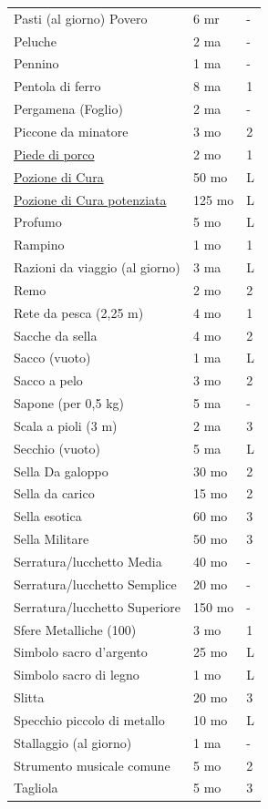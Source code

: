 \begin{multicols}{2}
\begin{tabular}{p{5.1cm}p{1.5cm}p{0.7cm}}
Pasti (al giorno) Povero & 6 mr & - \\
Peluche & 2 ma & - \\
Pennino & 1 ma & - \\
Pentola di ferro & 8 ma & 1 \\
Pergamena (Foglio) & 2 ma & - \\
Piccone da minatore & 3 mo & 2 \\
\hyperlink{piedediporco}{Piede di porco} & 2 mo & 1 \\
\hyperlink{Equip Pozione di Cura}{Pozione di Cura} & 50 mo & L \\
\hyperlink{Equip Pozione di Cura potenziata}{Pozione di Cura potenziata} & 125 mo & L \\
Profumo & 5 mo & L \\
Rampino & 1 mo & 1 \\
Razioni da viaggio (al giorno) & 3 ma & L \\
Remo & 2 mo & 2 \\
Rete da pesca (2,25 m) & 4 mo & 1 \\
Sacche da sella & 4 mo & 2 \\
Sacco (vuoto) & 1 ma & L \\
Sacco a pelo & 3 mo & 2 \\
Sapone (per 0,5 kg) & 5 ma & - \\
Scala a pioli (3 m) & 2 ma & 3 \\
Secchio (vuoto) & 5 ma & L \\
Sella Da galoppo & 30 mo & 2 \\
Sella da carico & 15 mo & 2 \\
Sella esotica & 60 mo & 3 \\
Sella Militare & 50 mo & 3 \\
Serratura/lucchetto Media & 40 mo & - \\
Serratura/lucchetto Semplice & 20 mo & - \\
Serratura/lucchetto Superiore & 150 mo & - \\
Sfere Metalliche (100) & 3 mo & 1 \\
Simbolo sacro d'argento & 25 mo & L \\
Simbolo sacro di legno & 1 mo & L \\
Slitta & 20 mo & 3 \\
Specchio piccolo di metallo & 10 mo & L \\
Stallaggio (al giorno) & 1 ma & - \\
Strumento musicale comune & 5 mo & 2 \\
Tagliola & 5 mo & 3 \\

\end{tabular}
\end{multicols}
